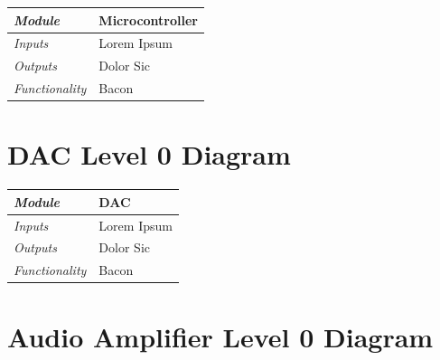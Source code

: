 \documentclass{article}
\begin{document}
\begin{tabular}{|p{1in}|p{5in}|}
\hline
\emph{Module} & Microcontroller \\
\hline
\emph{Inputs}& Lorem Ipsum\\
\hline
\emph{Outputs}& Dolor Sic \\ 
\hline
\emph{Functionality}& Bacon\\
\hline
\end{tabular}

\section{DAC Level 0 Diagram}

\begin{tabular}{|p{1in}|p{5in}|}
\hline
\emph{Module} & DAC \\
\hline
\emph{Inputs}& Lorem Ipsum\\
\hline
\emph{Outputs}& Dolor Sic \\ 
\hline
\emph{Functionality}& Bacon\\
\hline
\end{tabular}

\section{Audio Amplifier Level 0 Diagram}
\end{document}
